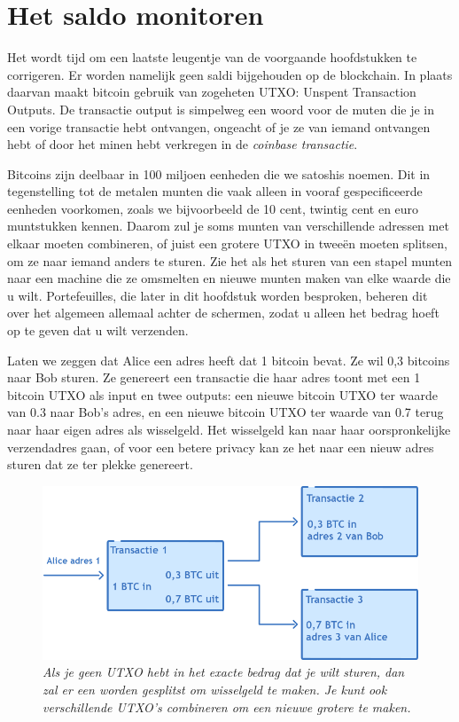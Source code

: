 \section{Het saldo monitoren}

Het wordt tijd om een laatste leugentje van de voorgaande hoofdstukken te corrigeren. Er worden namelijk geen saldi bijgehouden op de blockchain. In plaats daarvan maakt bitcoin gebruik van zogeheten UTXO: Unspent Transaction Outputs. De transactie output is simpelweg een woord voor de muten die je in een vorige transactie hebt ontvangen, ongeacht of je ze van iemand ontvangen hebt of door het minen hebt verkregen in de \textit{coinbase transactie}.

Bitcoins zijn deelbaar in 100 miljoen eenheden die we satoshis noemen. Dit in tegenstelling tot de metalen munten die vaak alleen in vooraf gespecificeerde eenheden voorkomen, zoals we bijvoorbeeld de 10 cent, twintig cent en euro muntstukken kennen. Daarom zul je soms munten van verschillende adressen met elkaar moeten combineren, of juist een grotere UTXO in tweeën moeten splitsen, om ze naar iemand anders te sturen. Zie het als het sturen van een stapel munten naar een machine die ze omsmelten en nieuwe munten maken van elke waarde die u wilt. Portefeuilles, die later in dit hoofdstuk worden besproken, beheren dit over het algemeen allemaal achter de schermen, zodat u alleen het bedrag hoeft op te geven dat u wilt verzenden.

Laten we zeggen dat Alice een adres heeft dat 1 bitcoin bevat. Ze wil 0,3 bitcoins naar Bob sturen. Ze genereert een transactie die haar adres toont met een 1 bitcoin UTXO als input en twee outputs: een nieuwe bitcoin UTXO ter waarde van 0.3 naar Bob's adres, en een nieuwe bitcoin UTXO ter waarde van 0.7 terug naar haar eigen adres als wisselgeld. Het wisselgeld kan naar haar oorspronkelijke verzendadres gaan, of voor een betere privacy kan ze het naar een nieuw adres sturen dat ze ter plekke genereert.

\begin{figure}
    \centering
    \includegraphics[width=\textwidth]{images/fig14.png}
    \caption{\footnotesize{\textit{Als je geen UTXO hebt in het exacte bedrag dat je wilt sturen, dan zal er een worden gesplitst om wisselgeld te maken. Je kunt ook verschillende UTXO's combineren om een nieuwe grotere te maken.}}}
    \label{fig14}
\end{figure}


